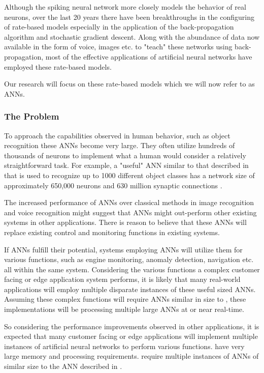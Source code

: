 Although the spiking neural network more closely models the behavior of real neurons, over the last 20 years there 
have been breakthroughs in the configuring of rate-based models especially in the application of the back-propagation
algorithm and stochastic gradient descent. Along with the abundance of data now available in the form of voice, images etc. to "teach" these networks
using back-propagation, most of the effective applications of artificial neural networks have employed these rate-based models.

Our research will focus on these rate-based models which we will now refer to as ANNs.
\fi


\subsubsection*{The Problem}
\label{sec:The Problem}

To approach the capabilities observed in human behavior, such as object recognition these ANNs become very large.
They often utilize hundreds of thousands of neurons to implement what a human would consider a relatively straightforward task.
For example, a "useful" ANN similar to that described in \cite{krizhevsky2012imagenet} that is used to recognize up to 1000 different object classes has a network size of approximately 650,000 neurons and 630 million synaptic connections \cite{krizhevsky2012imagenetPreso}. 

The increased performance of ANNs over classical methods in image recognition and voice recognition might suggest that ANNs might out-perform other existing systems in other applications.
There is reason to believe that these ANNs will replace existing control and monitoring functions in existing systems.

If ANNs fulfill their potential, systems employing ANNs will utilize them for various functions, such as engine monitoring, anomaly detection, navigation etc. all within the same system.
Considering the various functions a complex customer facing or edge application system performs, it is likely that many real-world applications will employ multiple disparate instances of these useful sized ANNs.
Assuming these complex functions will require ANNs similar in size to \cite{krizhevsky2012imagenet}, these implementations will be processing multiple large ANNs at or near real-time.

\iffalse
So considering the performance improvements observed in other applications, it is expected that many customer facing or edge applications will implement multiple instances of artificial neural networks to perform various functions.
have very large memory and processing requirements.
require multiple instances of ANNs of similar size to the ANN described in \cite{krizhevsky2012imagenet}.

